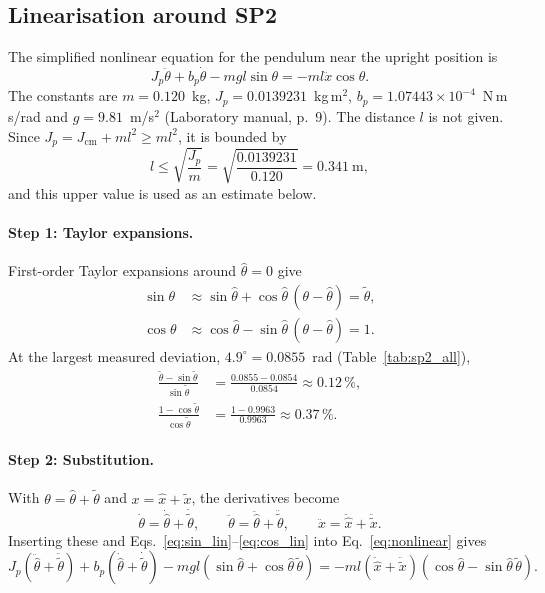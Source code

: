 \documentclass[11pt,a4paper]{article}
\newcommand{\manual}[1]{(Laboratory manual, p.~#1)}
\begin{document}
\subsection{Linearisation around SP2}

The simplified nonlinear equation for the pendulum near the upright position is
\begin{equation}
J_p\ddot{\theta} + b_p\dot{\theta} - mgl\sin\theta = -ml\ddot{x}\cos\theta.
\label{eq:nonlinear}
\end{equation}
The constants are $m = 0.120$~kg, $J_p = 0.0139231$~kg\,m$^2$,
$b_p = 1.07443\times10^{-4}$~N\,m\,s/rad and $g = 9.81$~m/s$^2$
\manual{9}. The distance $l$ is not given. Since
$J_p = J_\text{cm} + ml^2 \ge ml^2$, it is bounded by
\begin{equation*}
l \le \sqrt{\frac{J_p}{m}} = \sqrt{\frac{0.0139231}{0.120}} = 0.341~\text{m},
\end{equation*}
and this upper value is used as an estimate below.

\paragraph{Step 1: Taylor expansions.}
First-order Taylor expansions around $\hat{\theta} = 0$ give
\begin{align}
\sin\theta &\approx \sin\hat{\theta} + \cos\hat{\theta}\,(\theta - \hat{\theta}) = \tilde{\theta}, \label{eq:sin_lin} \\
\cos\theta &\approx \cos\hat{\theta} - \sin\hat{\theta}\,(\theta - \hat{\theta}) = 1. \label{eq:cos_lin}
\end{align}
At the largest measured deviation, $4.9^\circ = 0.0855$~rad (Table~\ref{tab:sp2_all}),
\begin{align*}
\frac{\tilde{\theta} - \sin\tilde{\theta}}{\sin\tilde{\theta}} &= \frac{0.0855 - 0.0854}{0.0854} \approx 0.12\,\%, \\
\frac{1 - \cos\tilde{\theta}}{\cos\tilde{\theta}} &= \frac{1 - 0.9963}{0.9963} \approx 0.37\,\%.
\end{align*}

\paragraph{Step 2: Substitution.}
With $\theta = \hat{\theta} + \tilde{\theta}$ and $x = \hat{x} + \tilde{x}$, the derivatives become
\begin{equation*}
\dot{\theta} = \dot{\hat{\theta}} + \dot{\tilde{\theta}}, \qquad
\ddot{\theta} = \ddot{\hat{\theta}} + \ddot{\tilde{\theta}}, \qquad
\ddot{x} = \ddot{\hat{x}} + \ddot{\tilde{x}}.
\end{equation*}
Inserting these and Eqs.~\eqref{eq:sin_lin}--\eqref{eq:cos_lin} into Eq.~\eqref{eq:nonlinear} gives
\begin{equation*}
J_p\left(\ddot{\hat{\theta}} + \ddot{\tilde{\theta}}\right)
+ b_p\left(\dot{\hat{\theta}} + \dot{\tilde{\theta}}\right)
- mgl\left(\sin\hat{\theta} + \cos\hat{\theta}\,\tilde{\theta}\right)
= -ml\left(\ddot{\hat{x}} + \ddot{\tilde{x}}\right)\left(\cos\hat{\theta} - \sin\hat{\theta}\,\tilde{\theta}\right).
\end{equation*}
\end{document}
